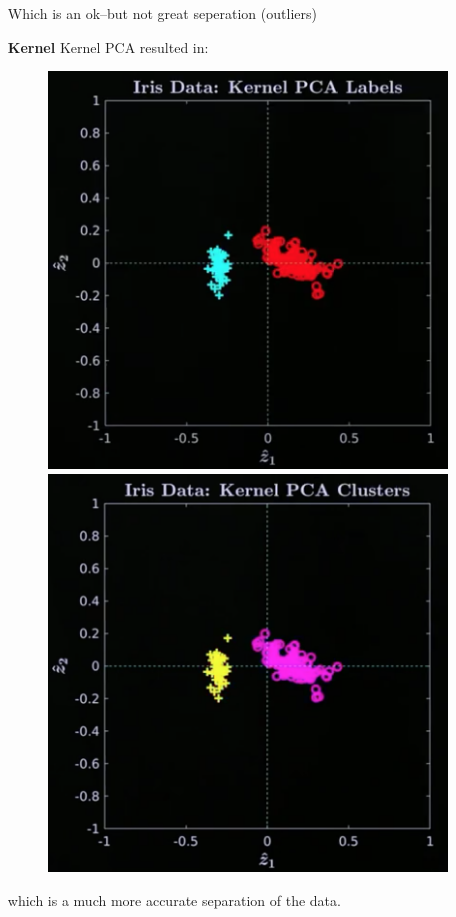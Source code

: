 \documentclass[12pt]{book}
\begin{document}
\begin{itemize}
                Which is an ok--but not great seperation (outliers)
        \item[\textbf{Kernel}] Kernel PCA resulted in:
                \begin{figure}[h]
                        \centering
                        \includegraphics[scale=0.4]{./figures/data2}
                        \includegraphics[scale=0.4]{./figures/kmean2}
                \end{figure}

                which is a much more accurate separation of
                the data.
\end{itemize}
\end{document}
